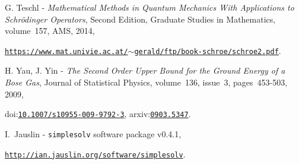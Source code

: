 G. Teschl - {\it Mathematical Methods in Quantum Mechanics With Applications to Schr\"odinger Operators}, Second Edition, Graduate Studies in Mathematics, volume\-~157, AMS, 2014,\par{}
{\tt\color{blue}\href{https://www.mat.univie.ac.at/~gerald/ftp/book-schroe/schroe2.pdf}{https://www.mat.univie.ac.at/$\sim$gerald/ftp/book-schroe/schroe2.pdf}}.\par\medskip
 
H. Yau, J. Yin - {\it The Second Order Upper Bound for the Ground Energy of a Bose Gas}, Journal of Statistical Physics, volume\-~136, issue\-~3, pages\-~453-503, 2009,\par{}
doi:{\tt\color{blue}\href{http://dx.doi.org/10.1007/s10955-009-9792-3}{10.1007/s10955-009-9792-3}}, arxiv:{\tt\color{blue}\href{http://arxiv.org/abs/0903.5347}{0903.5347}}.\par\medskip
 
I.\-~Jauslin - {\tt simplesolv} software package v0.4.1,\par{}
{\tt\color{blue}\href{http://ian.jauslin.org/software/simplesolv}{http://ian.jauslin.org/software/simplesolv}}.\par\medskip
 
